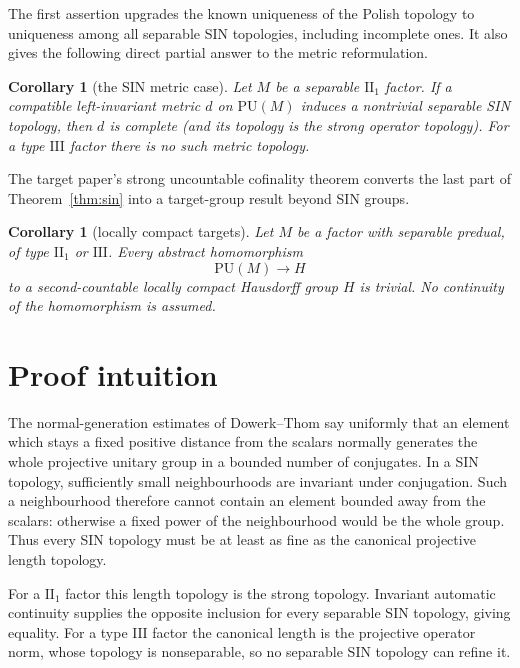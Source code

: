\documentclass[11pt]{article}
\newtheorem{corollary}[theorem]{Corollary}
\newcommand{\PU}{\mathrm{PU}}
\begin{document}
The first assertion upgrades the known uniqueness of the Polish topology to
uniqueness among all separable SIN topologies, including incomplete ones.  It
also gives the following direct partial answer to the metric reformulation.

\begin{corollary}[the SIN metric case]\label{cor:metric}
Let $M$ be a separable $\mathrm{II}_1$ factor.  If a compatible
left-invariant metric $d$ on $\PU(M)$ induces a nontrivial separable SIN
topology, then $d$ is complete (and its topology is the strong operator
topology).  For a type $\mathrm{III}$ factor there is no such metric topology.
\end{corollary}

The target paper's strong uncountable cofinality theorem converts the last
part of Theorem~\ref{thm:sin} into a target-group result beyond SIN groups.

\begin{corollary}[locally compact targets]\label{cor:lc}
Let $M$ be a factor with separable predual, of type $\mathrm{II}_1$ or
$\mathrm{III}$.  Every abstract
homomorphism
\[
              \PU(M)\longrightarrow H
\]
to a second-countable locally compact Hausdorff group $H$ is trivial.  No
continuity of the homomorphism is assumed.
\end{corollary}

\section{Proof intuition}

The normal-generation estimates of Dowerk--Thom say uniformly that an element
which stays a fixed positive distance from the scalars normally generates the
whole projective unitary group in a bounded number of conjugates.  In a SIN
topology, sufficiently small neighbourhoods are invariant under conjugation.
Such a neighbourhood therefore cannot contain an element bounded away from
the scalars: otherwise a fixed power of the neighbourhood would be the whole
group.  Thus every SIN topology must be at least as fine as the canonical
projective length topology.

For a $\mathrm{II}_1$ factor this length topology is the strong topology.
Invariant automatic continuity supplies the opposite inclusion for every
separable SIN topology, giving equality.  For a type $\mathrm{III}$ factor the
canonical length is the projective operator norm, whose topology is
nonseparable, so no separable SIN topology can refine it.
\end{document}
